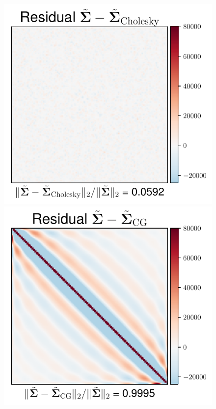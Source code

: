 \documentclass[nohypdvips,onefignum,onetabnum]{siamart171218}
\begin{document}
\begin{figure}
  \mbox{{\includegraphics[scale=0.4]{images/simu1_ex1_invA_Chol.pdf}}}
  \mbox{{\includegraphics[scale=0.4]{images/simu1_ex1_invA_CG.pdf}}}

\end{figure}
\end{document}
